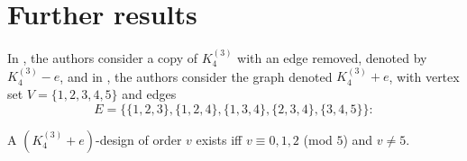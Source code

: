 \section{Further results}

In \cite{feng-chang2}, the authors consider a copy of $K_4^{(3)}$ with an edge removed, denoted by $K_4^{(3)} - e$, and in \cite{feng-chang}, the authors consider the graph denoted $K_4^{(3)} + e$, with vertex set $V = \{1,2,3,4,5\}$ and edges \[E = \{\{1,2,3\},\{1,2,4\},\{1,3,4\},\{2,3,4\},\{3,4,5\}\}:\]

\begin{theorem}
A $(K_4^{(3)}+e)$-design of order $v$ exists iff $v \equiv 0,1,2$ (mod $5$) and $v \neq 5$.
\end{theorem}

